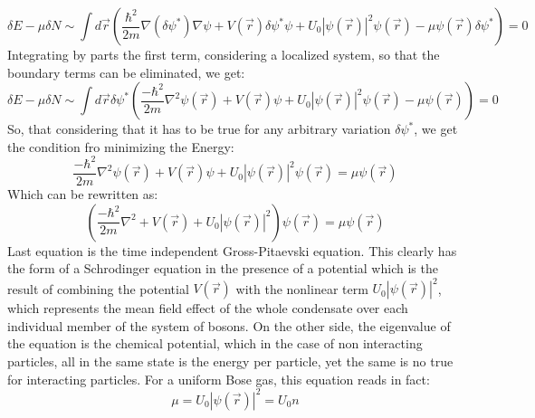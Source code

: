 \documentclass[a4paper,10pt]{article}
\begin{document}
\begin{equation}
 \delta E-\mu \delta N \sim \int d\vec{r} \left(\frac{\hbar^2}{2m}\nabla( \delta \psi^*)\nabla \psi +V(\vec{r})\delta \psi^* \psi +U_0 |\psi(\vec{r})|^2 \psi(\vec{r})-\mu \psi(\vec{r}) \delta \psi^*\right)=0
\end{equation}
Integrating by parts the first term, considering a localized system, so that the boundary terms can be eliminated, we get:
\begin{equation}
 \delta E-\mu \delta N \sim \int d\vec{r}\delta \psi^* \left(\frac{-\hbar^2}{2m}\nabla^2 \psi(\vec{r}) +V(\vec{r}) \psi +U_0 |\psi(\vec{r})|^2 \psi(\vec{r})-\mu \psi(\vec{r})\right)=0
\end{equation}
So, that considering that it has to be true for any arbitrary variation $\delta \psi^*$, we get the condition fro minimizing the Energy:
\begin{equation}\label{GP_Eq1}
 \frac{-\hbar^2}{2m}\nabla^2 \psi(\vec{r}) +V(\vec{r}) \psi +U_0 |\psi(\vec{r})|^2 \psi(\vec{r})=\mu \psi(\vec{r})
\end{equation}
Which can be rewritten as:
\begin{equation}\label{GP_Eq}
 \left(\frac{-\hbar^2}{2m}\nabla^2 +V(\vec{r}) +U_0 |\psi(\vec{r})|^2 \right)\psi(\vec{r})=\mu \psi(\vec{r})
\end{equation}
Last equation is the time independent Gross-Pitaevski equation. This clearly has the form of a Schrodinger equation in the presence of a potential which is the result of combining the potential $V(\vec{r})$ with the nonlinear term $U_0|\psi(\vec{r})|^2$, which represents the mean field effect of the whole condensate over each individual member of the system of bosons. On the other side, the eigenvalue of the equation is the chemical potential, which in the case of non interacting particles, all in the same state is the energy per particle, yet the same is no true for interacting particles. For a uniform Bose gas, this equation reads in fact:
\begin{equation}\label{GP_uniform_Bose_gas}
\mu=U_0|\psi(\vec{r})|^2=U_0 n 
\end{equation}
\end{document}

